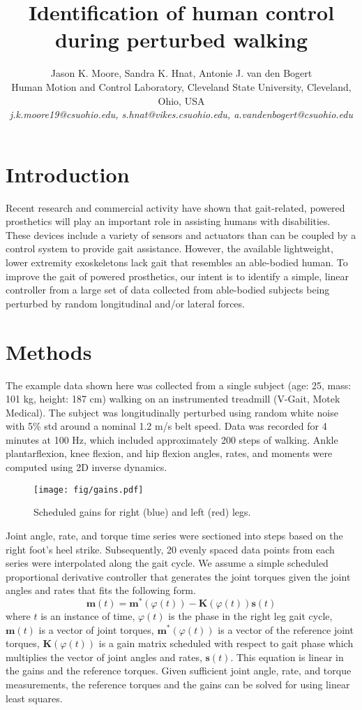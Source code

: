 \documentclass{dw2014}
\title{Identification of human control during perturbed walking}
\author{
  Jason K. Moore, Sandra K. Hnat, Antonie J. van den Bogert\\
  Human Motion and Control Laboratory, Cleveland State University, Cleveland, Ohio, USA\\
  {\it j.k.moore19@csuohio.edu, s.hnat@vikes.csuohio.edu,
  a.vandenbogert@csuohio.edu}
}
\date{}
\begin{document}
\maketitle

\section*{Introduction}
%
Recent research and commercial activity have shown that gait-related, powered
prosthetics will play an important role in assisting humans with disabilities.
These devices include a variety of sensors and actuators than can be coupled by
a control system to provide gait assistance. However, the available
lightweight, lower extremity exoskeletons lack gait that resembles an
able-bodied human. To improve the gait of powered prosthetics, our intent is to
identify a simple, linear controller from a large set of data collected from
able-bodied subjects being perturbed by random longitudinal and/or lateral
forces.
%
\section*{Methods}
The example data shown here was collected from a single subject (age: 25, mass:
101 kg, height: 187 cm) walking on an instrumented treadmill (V-Gait, Motek
Medical). The subject was longitudinally perturbed using random white noise
with 5\% std around a nominal 1.2 m/s belt speed. Data was recorded for 4
minutes at 100 Hz, which included approximately 200 steps of walking.  Ankle
plantarflexion, knee flexion, and hip flexion angles, rates, and moments were
computed using 2D inverse dynamics.
%
\begin{figure}[hbt]
  \begin{center}
    \texttt{[image: fig/gains.pdf]}
    \caption{Scheduled gains for right (blue) and left (red) legs.}
    \label{fig:gains}
  \end{center}
\end{figure}

Joint angle, rate, and torque time series were sectioned into steps based on
the right foot's heel strike. Subsequently, 20 evenly spaced data points from
each series were interpolated along the gait cycle. We assume a simple
scheduled proportional derivative controller that generates the joint torques
given the joint angles and rates that fits the following form.
%
\begin{equation}
  \mathbf{m}(t) = \mathbf{m}^*(\varphi(t)) -
  \mathbf{K}(\varphi(t))\mathbf{s}(t)
\end{equation}
%
where $t$ is an instance of time, $\varphi(t)$ is the phase in the right leg
gait cycle, $\mathbf{m}(t)$ is a vector of joint torques,
$\mathbf{m}^*(\varphi(t))$ is a vector of the reference joint torques,
$\mathbf{K}(\varphi(t))$ is a gain matrix scheduled with respect to gait
phase which multiplies the vector of joint angles and rates, $\mathbf{s}(t)$.
This equation is linear in the gains and the reference torques. Given
sufficient joint angle, rate, and torque measurements, the reference torques
and the gains can be solved for using linear least squares.
%
\end{document}
